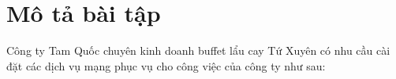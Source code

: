 \documentclass[a4paper]{article} %
\begin{document}


\renewcommand{\contentsname}{MỤC LỤC}
\tableofcontents
\thispagestyle{empty}
\cleardoublepage


\setlength{\cftfigindent}{0pt}
\setlength{\cftfignumwidth}{4em}
\renewcommand{\cftfigdotsep}{1.5}
\renewcommand{\figurename}{\fontsize{12pt}{0pt}\selectfont Hình}
\renewcommand{\cftfigpresnum}{\figurename~}
\renewcommand{\listfigurename}{DANH MỤC HÌNH}
{}
\listoffigures
\cleardoublepage


{}
\listofcode
\cleardoublepage

\setlength{\cfttabindent}{0pt}
\setlength{\cfttabnumwidth}{4em}
\renewcommand{\cfttabdotsep}{1.5}
\renewcommand{\tablename}{\fontsize{12pt}{0pt}\selectfont Bảng}
\renewcommand{\cfttabpresnum}{\tablename~}
\renewcommand{\listtablename}{DANH MỤC BẢNG}
{}
\listoftables
\cleardoublepage



\section*{Mô tả bài tập}

Công ty Tam Quốc chuyên kinh doanh buffet lẩu cay Tứ Xuyên có nhu cầu cài đặt
các dịch vụ mạng phục vụ cho công việc của công ty như sau:

\setcounter{section}{0}
\setcounter{subsection}{1}
\setcounter{figure}{0}


\setcounter{subsection}{0}

\newpage
\end{document}
